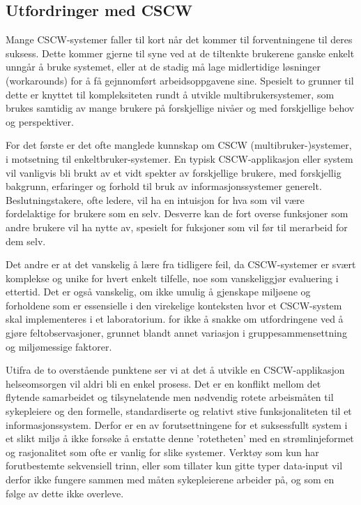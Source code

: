 \subsection{Utfordringer med CSCW}
\label{chp: utfordringerMedCSCW}

Mange CSCW-systemer faller til kort når det kommer til forventningene til deres suksess. Dette kommer gjerne til syne ved at de tiltenkte brukerene ganske enkelt unngår å bruke systemet, eller at de stadig må lage midlertidige løsninger (workarounds) for å få gejnnomført arbeidsoppgavene sine. Spesielt to grunner til dette er knyttet til kompleksiteten rundt å utvikle multibrukersystemer, som brukes samtidig av mange brukere på forskjellige nivåer og med forskjellige behov og perspektiver.

\noindent
For det første er det ofte manglede kunnskap om CSCW (multibruker-)systemer, i motsetning til enkeltbruker-systemer. En typisk CSCW-applikasjon eller system vil vanligvis bli brukt av et vidt spekter av forskjellige brukere, med forskjellig bakgrunn, erfaringer og forhold til bruk av informasjonssystemer generelt. Beslutningstakere, ofte ledere, vil ha en intuisjon for hva som vil være fordelaktige for brukere som en selv. Desverre kan de fort overse funksjoner som andre brukere vil ha nytte av, spesielt for fuksjoner som vil før til merarbeid for dem selv. 

\noindent
Det andre er at det vanskelig å lære fra tidligere feil, da CSCW-systemer er svært komplekse og unike for hvert enkelt tilfelle, noe som vanskeliggjør evaluering i ettertid. Det er også vanskelig, om ikke umulig å gjenskape miljøene og forholdene som er essensielle i den virekelige konteksten hvor et CSCW-system skal implementeres i et laboratorium. for ikke å snakke om utfordringene ved å gjøre feltobservasjoner, grunnet blandt annet variasjon i gruppesammensettning og miljømessige faktorer.

\noindent
Utifra de to overstående punktene ser vi at det å utvikle en CSCW-applikasjon helseomsorgen vil aldri bli en enkel prosess. Det er en konflikt mellom det flytende samarbeidet og tilsynelatende men nødvendig rotete arbeismåten til sykepleiere og den formelle, standardiserte og relativt stive funksjonaliteten til et informasjonssystem. Derfor er en av forutsettningene for et suksessfullt system i et slikt miljø å ikke forsøke å erstatte denne 'rotetheten' med en strømlinjeformet og rasjonalitet som ofte er vanlig for slike systemer. Verktøy som kun har forutbestemte sekvensiell trinn, eller som tillater kun gitte typer data-input vil derfor ikke fungere sammen med måten sykepleierene arbeider på, og som en følge av dette ikke overleve.\cite{Berg99}